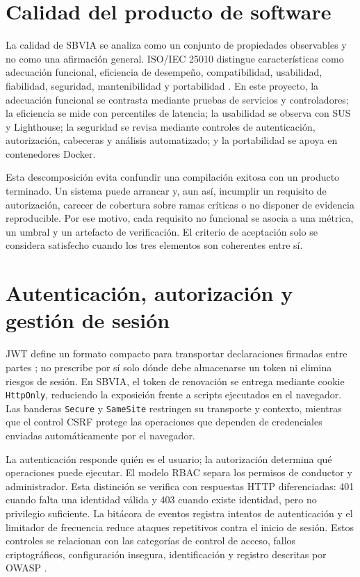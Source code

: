 \documentclass[11pt,a4paper]{report}
\begin{document}
\section{Calidad del producto de software}
La calidad de SBVIA se analiza como un conjunto de propiedades observables y no como una afirmación general. ISO/IEC 25010 distingue características como adecuación funcional, eficiencia de desempeño, compatibilidad, usabilidad, fiabilidad, seguridad, mantenibilidad y portabilidad \cite{iso25010}. En este proyecto, la adecuación funcional se contrasta mediante pruebas de servicios y controladores; la eficiencia se mide con percentiles de latencia; la usabilidad se observa con SUS y Lighthouse; la seguridad se revisa mediante controles de autenticación, autorización, cabeceras y análisis automatizado; y la portabilidad se apoya en contenedores Docker.

Esta descomposición evita confundir una compilación exitosa con un producto terminado. Un sistema puede arrancar y, aun así, incumplir un requisito de autorización, carecer de cobertura sobre ramas críticas o no disponer de evidencia reproducible. Por ese motivo, cada requisito no funcional se asocia a una métrica, un umbral y un artefacto de verificación. El criterio de aceptación solo se considera satisfecho cuando los tres elementos son coherentes entre sí.

\section{Autenticación, autorización y gestión de sesión}
JWT define un formato compacto para transportar declaraciones firmadas entre partes \cite{rfc7519}; no prescribe por sí solo dónde debe almacenarse un token ni elimina riesgos de sesión. En SBVIA, el token de renovación se entrega mediante cookie \texttt{HttpOnly}, reduciendo la exposición frente a scripts ejecutados en el navegador. Las banderas \texttt{Secure} y \texttt{SameSite} restringen su transporte y contexto, mientras que el control CSRF protege las operaciones que dependen de credenciales enviadas automáticamente por el navegador.

La autenticación responde quién es el usuario; la autorización determina qué operaciones puede ejecutar. El modelo RBAC separa los permisos de conductor y administrador. Esta distinción se verifica con respuestas HTTP diferenciadas: 401 cuando falta una identidad válida y 403 cuando existe identidad, pero no privilegio suficiente. La bitácora de eventos registra intentos de autenticación y el limitador de frecuencia reduce ataques repetitivos contra el inicio de sesión. Estos controles se relacionan con las categorías de control de acceso, fallos criptográficos, configuración insegura, identificación y registro descritas por OWASP \cite{owasp2021}.
\end{document}
